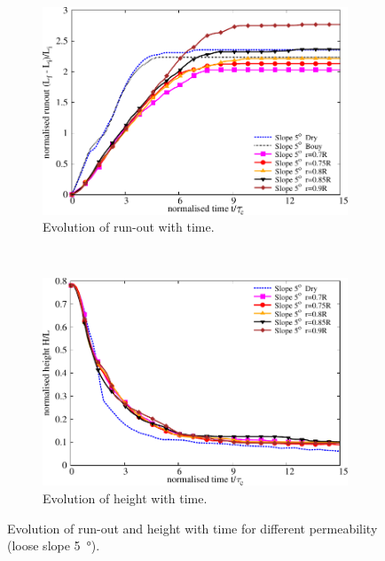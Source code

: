 \begin{figure}
\centering
\begin{subfigure}[b]{0.95\textwidth}
\centering
\includegraphics[width=0.95\columnwidth]{Runout_loose_5_slope}
\caption{Evolution of run-out with time.}
\label{fig:run5}
\end{subfigure}\\
\begin{subfigure}[b]{0.95\textwidth}
\centering
\includegraphics[width=0.95\columnwidth]{Height_loose_5_slope}
\caption{Evolution of height with time.}
\label{fig:height5}
\end{subfigure}
\caption{Evolution of run-out and height with time for different permeability 
(loose slope \SI{5}{\degree}).}
\label{fig:height_run_5}
\end{figure}

